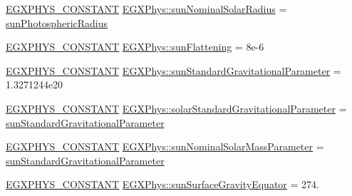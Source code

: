 \begin{DoxyCompactItemize}
\item 
\mbox{\hyperlink{group___e_g_x_phys-_constants-_macros_ga76980d288494ce1714c9ac68a95ba702}{E\+G\+X\+P\+H\+Y\+S\+\_\+\+C\+O\+N\+S\+T\+A\+NT}} \mbox{\hyperlink{group___e_g_x_phys-_constants-_astrophysics-_solar_system-_sun-_bulk_ga5bebe7d507ffd0372e8e1a20e3662d5d}{E\+G\+X\+Phys\+::sun\+Nominal\+Solar\+Radius}} = \mbox{\hyperlink{group___e_g_x_phys-_constants-_astrophysics-_solar_system-_sun-_bulk_gac257be308fa17adaf47f3310c5c65377}{sun\+Photospheric\+Radius}}
\item 
\mbox{\hyperlink{group___e_g_x_phys-_constants-_macros_ga76980d288494ce1714c9ac68a95ba702}{E\+G\+X\+P\+H\+Y\+S\+\_\+\+C\+O\+N\+S\+T\+A\+NT}} \mbox{\hyperlink{group___e_g_x_phys-_constants-_astrophysics-_solar_system-_sun-_bulk_ga4487692a8eaf3f3eec0aae769eefcabb}{E\+G\+X\+Phys\+::sun\+Flattening}} = 8e-\/6
\item 
\mbox{\hyperlink{group___e_g_x_phys-_constants-_macros_ga76980d288494ce1714c9ac68a95ba702}{E\+G\+X\+P\+H\+Y\+S\+\_\+\+C\+O\+N\+S\+T\+A\+NT}} \mbox{\hyperlink{group___e_g_x_phys-_constants-_astrophysics-_solar_system-_sun-_bulk_ga17d411dceb8d2ff98b8a270eaa72117d}{E\+G\+X\+Phys\+::sun\+Standard\+Gravitational\+Parameter}} = 1.\+3271244e20
\item 
\mbox{\hyperlink{group___e_g_x_phys-_constants-_macros_ga76980d288494ce1714c9ac68a95ba702}{E\+G\+X\+P\+H\+Y\+S\+\_\+\+C\+O\+N\+S\+T\+A\+NT}} \mbox{\hyperlink{group___e_g_x_phys-_constants-_astrophysics-_solar_system-_sun-_bulk_gaa3846a73b10df493a64f08114333d67c}{E\+G\+X\+Phys\+::solar\+Standard\+Gravitational\+Parameter}} = \mbox{\hyperlink{group___e_g_x_phys-_constants-_astrophysics-_solar_system-_sun-_bulk_ga17d411dceb8d2ff98b8a270eaa72117d}{sun\+Standard\+Gravitational\+Parameter}}
\item 
\mbox{\hyperlink{group___e_g_x_phys-_constants-_macros_ga76980d288494ce1714c9ac68a95ba702}{E\+G\+X\+P\+H\+Y\+S\+\_\+\+C\+O\+N\+S\+T\+A\+NT}} \mbox{\hyperlink{group___e_g_x_phys-_constants-_astrophysics-_solar_system-_sun-_bulk_gaadeeeb0634200ad2ad89a5b8b721dd8d}{E\+G\+X\+Phys\+::sun\+Nominal\+Solar\+Mass\+Parameter}} = \mbox{\hyperlink{group___e_g_x_phys-_constants-_astrophysics-_solar_system-_sun-_bulk_ga17d411dceb8d2ff98b8a270eaa72117d}{sun\+Standard\+Gravitational\+Parameter}}
\item 
\mbox{\hyperlink{group___e_g_x_phys-_constants-_macros_ga76980d288494ce1714c9ac68a95ba702}{E\+G\+X\+P\+H\+Y\+S\+\_\+\+C\+O\+N\+S\+T\+A\+NT}} \mbox{\hyperlink{group___e_g_x_phys-_constants-_astrophysics-_solar_system-_sun-_bulk_ga041c4c2f7860c1b1fa4435b2be962c50}{E\+G\+X\+Phys\+::sun\+Surface\+Gravity\+Equator}} = 274.

\end{DoxyCompactItemize}
